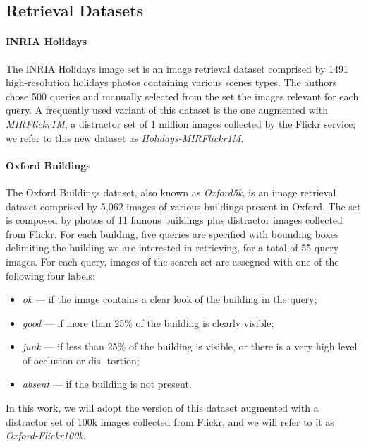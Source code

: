 \subsection{Retrieval Datasets}

\paragraph{INRIA Holidays~\cite{jegou2008hamming}}

The INRIA Holidays image set is an image retrieval dataset comprised by 1491 high-resolution holidays photos containing various scenes types.
The authors chose 500 queries and manually selected from the set the images relevant for each query.
A frequently used variant of this dataset is the one augmented with \emph{MIRFlickr1M}, a distractor set of 1 million images collected by the Flickr service;
we refer to this new dataset as \emph{Holidays-MIRFlickr1M}.

\paragraph{Oxford Buildings~\cite{philbin2007object}}
The Oxford Buildings dataset, also known as \emph{Oxford5k}, is an image retrieval dataset comprised by 5,062 images of various buildings present in Oxford.
The set is composed by photos of 11 famous buildings plus distractor images collected from Flickr.
For each building, five queries are specified with bounding boxes delimiting the building we are interested in retrieving, for a total of 55 query images.
For each query, images of the search set are assegned with one of the following four labels:
\begin{itemize}
    \item \emph{ok} --- if the image contains a clear look of the building in the query;
    \item \emph{good} --- if more than 25\% of the building is clearly visible;
    \item \emph{junk} --- if less than 25\% of the building
is visible, or there is a very high level of occlusion or dis-
tortion;
    \item \emph{absent} --- if the building is not present.
\end{itemize}
In this work, we will adopt the version of this dataset augmented with a distractor set of 100k images collected from Flickr, and we will refer to it as \emph{Oxford-Flickr100k}.


